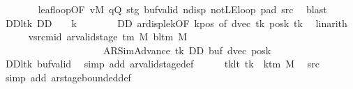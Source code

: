 \begin{isabellebody}
\ \ \ \ \ \ \isamarkupfalse%
\ leaf{\isacharunderscore}{\kern0pt}loop{\isacharbrackleft}{\kern0pt}OF\ vM\ qQ\ stg\ buf{\isacharunderscore}{\kern0pt}valid\ ndisp\ notLE{\isacharunderscore}{\kern0pt}loop\ pad{}\ src{}{\isacharbrackright}{\kern0pt}\ \isamarkupfalse%
\ blast\isanewline
\ \ \ \ \isamarkupfalse%
\ DD{\isacharunderscore}{\kern0pt}lt{}k{\isacharcolon}{\kern0pt}\ {\isachardoublequoteopen}DD\ {\isacharless}{\kern0pt}\ {}\ {\isacharasterisk}{\kern0pt}\ {\isacharquery}{\kern0pt}k{\isachardoublequoteclose}\isanewline
\ \ \ \ \ \ \isamarkupfalse%
\ DD\ ar{\isacharunderscore}{\kern0pt}disp{\isacharunderscore}{\kern0pt}le{\isacharunderscore}{\kern0pt}{}k{\isacharbrackleft}{\kern0pt}OF\ kpos{\isacharcomma}{\kern0pt}\ of\ {\isachardoublequoteopen}dvec\ tk{\isachardoublequoteclose}\ {\isachardoublequoteopen}posk\ tk{\isachardoublequoteclose}{\isacharbrackright}{\kern0pt}\ \isamarkupfalse%
\ linarith\isanewline
\ \ \ \ \isamarkupfalse%
\ vsrcmid{\isacharcolon}{\kern0pt}\ {\isachardoublequoteopen}ar{\isacharunderscore}{\kern0pt}valid{\isacharunderscore}{\kern0pt}stage\ {\isacharparenleft}{\kern0pt}{\isasymGamma}{\isacharunderscore}{\kern0pt}tm\ M{\isacharparenright}{\kern0pt}\ {\isacharparenleft}{\kern0pt}bl{\isacharunderscore}{\kern0pt}tm\ M{\isacharparenright}{\kern0pt}\isanewline
\ \ \ \ \ \ \ \ \ \ \ \ \ \ \ \ \ \ \ \ \ {\isacharparenleft}{\kern0pt}AR{\isacharunderscore}{\kern0pt}SimAdvance{\isacharcomma}{\kern0pt}\ tk{\isacharcomma}{\kern0pt}\ DD{\isacharcomma}{\kern0pt}\ buf{\isacharcomma}{\kern0pt}\ dvec{\isacharcomma}{\kern0pt}\ posk{\isacharparenright}{\kern0pt}{\isachardoublequoteclose}\isanewline
\ \ \ \ \ \ \isamarkupfalse%
\ DD{\isacharunderscore}{\kern0pt}lt{}k\ buf{\isacharunderscore}{\kern0pt}valid\ \isamarkupfalse%
\ {\isacharparenleft}{\kern0pt}simp\ add{\isacharcolon}{\kern0pt}\ ar{\isacharunderscore}{\kern0pt}valid{\isacharunderscore}{\kern0pt}stage{\isacharunderscore}{\kern0pt}def{\isacharparenright}{\kern0pt}\isanewline
\ \ \ \ \isamarkupfalse%
\ tk{\isacharunderscore}{\kern0pt}lt{\isacharcolon}{\kern0pt}\ {\isachardoublequoteopen}tk\ {\isacharless}{\kern0pt}\ k{\isacharunderscore}{\kern0pt}tm\ M{\isachardoublequoteclose}\ \isamarkupfalse%
\ src{}\ \isamarkupfalse%
\ {\isacharparenleft}{\kern0pt}simp\ add{\isacharcolon}{\kern0pt}\ ar{\isacharunderscore}{\kern0pt}stage{\isacharunderscore}{\kern0pt}bounded{\isacharunderscore}{\kern0pt}def{\isacharparenright}{\kern0pt}\isanewline

\end{isabellebody}
